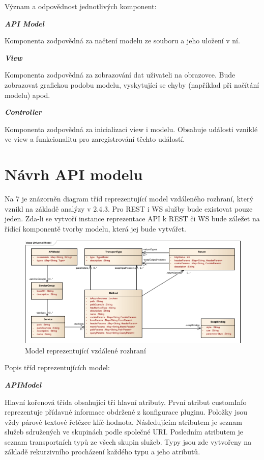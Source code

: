 \documentclass[11pt,twoside,a4paper]{book}
\begin{document}
Význam a odpovědnost jednotlivých komponent:

\textbf{\textit{API Model}}

Komponenta zodpovědná za načtení modelu ze souboru a jeho uložení v ní.

\textbf{\textit{View}}

Komponenta zodpovědná za zobrazování dat uživateli na obrazovce. Bude zobrazovat
grafickou podobu modelu, vyskytující se chyby (například při načítání modelu) apod.

\textbf{\textit{Controller}}

Komponenta zodpovědná za inicializaci view i modelu. Obsahuje události vzniklé ve view a
funkcionalitu pro zaregistrování těchto událostí.

\section{Návrh API modelu}

Na 7 je znázorněn diagram tříd reprezentující model vzdáleného rozhraní, který vznikl na
základě analýzy v 2.4.3. Pro REST i WS služby bude existovat pouze jeden. Zda-li se vytvoří
instance reprezentace API k REST či WS bude záležet na řídící komponentě tvorby modelu,
která jej bude vytvářet.

\begin{figure}[h]
\begin{center}
\includegraphics[width=13cm]{images-pdf/Universal-Model.pdf}
\caption{Model reprezentující vzdálené rozhraní}
\label{fig:logo}
\end{center}
\end{figure}

Popis tříd reprezentujících model:

\textbf{\textit{APIModel}}

Hlavní kořenová třída obsahující tři hlavní atributy. První atribut customInfo reprezentuje
přídavné informace obdržené z konfigurace pluginu. Položky jsou vždy párové textové
řetězce klíč-hodnota. Následujícím atributem je seznam služeb sdružených ve skupinách
podle společné URI. Posledním atributem je seznam transportních typů ze všech skupin
služeb. Typy jsou zde vytvořeny na základě rekurzivního procházení každého typu a jeho
atributů.
\end{document}
